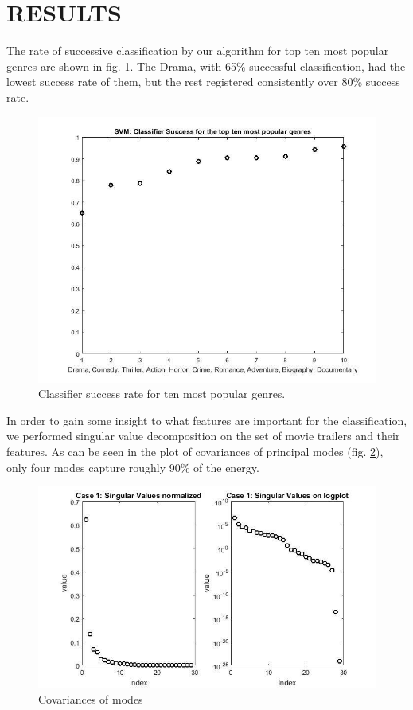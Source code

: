 \documentclass[letterpaper, 10 pt, conference]{ieeeconf}  %
\begin{document}
\section{RESULTS}
The rate of successive classification by our algorithm for top ten most popular genres are shown in fig. \ref{f:success_rate_table}. The Drama, with 65\% successful classification, had the lowest success rate of them, but the rest registered consistently over 80\% success rate.\\
\begin{figure}[h]
	\centering
	\includegraphics[width=\columnwidth]{success_rate.jpg}
	\caption{Classifier success rate for ten most popular genres.}
	\label{f:success_rate_table}
\end{figure}
In order to gain some insight to what features are important for the classification, we performed singular value decomposition on the set of movie trailers and their features. As can be seen in the plot of covariances of principal modes (fig. \ref{f:mode_covar}), only four modes capture roughly 90\% of the energy.
\begin{figure}[h]
	\centering
	\includegraphics[width=\columnwidth]{mode_covar.jpg}
	\caption{Covariances of modes}
	\label{f:mode_covar}
\end{figure}
\end{document}
